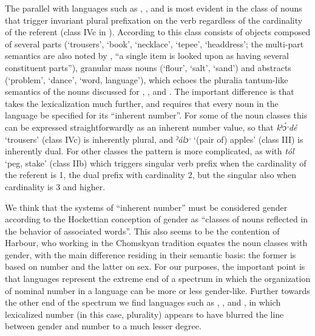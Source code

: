 \documentclass[output=collectionpaper]{langsci/langscibook}
\begin{document}
The parallel with languages such as , ,  and  is most evident in the class of  nouns that trigger invariant plural prefixation on the verb regardless of the cardinality of the referent (class IVc in \citealt{Watkins1984}). According to \cite[46]{Harbour2008} this class consists of objects composed of several parts (`trousers', `book', `necklace', `tepee', `headdress'; the multi-part semantics are also noted by \citealt[270]{Merrifield1959}, ``a single item is looked upon as having several constituent parts''), granular mass nouns (`flour', `salt', `sand') and abstracts (`problem', `dance', `word, language'), which echoes the pluralia tantum-like semantics of the nouns discussed for , ,  and . The important difference is that  takes the lexicalization much further, and requires that every noun in the language be specified for its ``inherent number''. For some of the  noun classes this can be expressed straightforwardly as an inherent number value, so that  \textit{kʰɔ́ˑdé} `trousers' (class IVc) is inherently plural, and \textit{ˀálɔˑ} `(pair of) apples' (class III) is inherently dual. For other classes the pattern is more complicated, as with \textit{tól} `peg, stake' (class IIb) which triggers singular verb prefix when the cardinality of the referent is 1, the dual prefix with cardinality 2, but the singular also when cardinality is 3 and higher.

We think that the  systems of ``inherent number'' must be considered gender according to the Hockettian conception of gender as ``classes of nouns reflected in the behavior of associated words''. This also seems to be the contention of Harbour, who \textendash{} working in the Chomskyan tradition \textendash{} equates the  noun classes with  gender, with the main difference residing in their semantic basis: the former is based on number and the latter on sex. For our purposes, the important point is that  languages represent the extreme end of a spectrum in which the organization of nominal number in a language can be more or less gender-like. Further towards the other end of the spectrum we find languages such as , ,  and , in which lexicalized number (in this case, plurality) appears to have blurred the line between gender and number to a much lesser degree.
\end{document}
